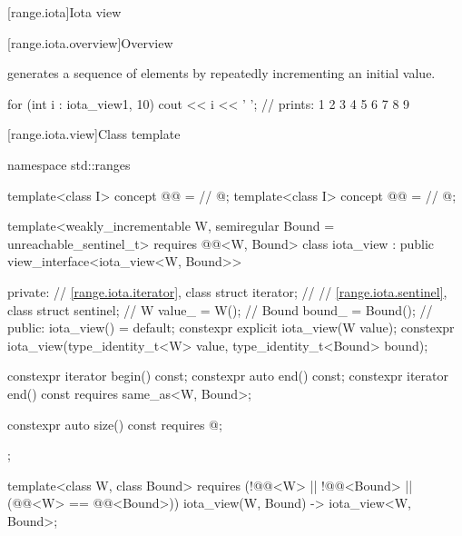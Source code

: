 [range.iota]{Iota view}

[range.iota.overview]{Overview}

\pnum
{} generates a
sequence of elements by repeatedly incrementing an initial value.

\pnum
\begin{example}
\begin{codeblock}
for (int i : iota_view{1, 10})
  cout << i << ' '; // prints: 1 2 3 4 5 6 7 8 9
\end{codeblock}
\end{example}

[range.iota.view]{Class template }

\begin{codeblock}
namespace std::ranges {
  template<class I>
    concept @@ =     // \expos
      @\seebelow@;
  template<class I>
    concept @@ =       // \expos
      @\seebelow@;

  template<weakly_incrementable W, semiregular Bound = unreachable_sentinel_t>
    requires @@<W, Bound>
  class iota_view : public view_interface<iota_view<W, Bound>> {
  private:
    // \ref{range.iota.iterator}, class 
    struct iterator;            // \expos
    // \ref{range.iota.sentinel}, class 
    struct sentinel;            // \expos
    W value_ = W();             // \expos
    Bound bound_ = Bound();     // \expos
  public:
    iota_view() = default;
    constexpr explicit iota_view(W value);
    constexpr iota_view(type_identity_t<W> value,
                        type_identity_t<Bound> bound);

    constexpr iterator begin() const;
    constexpr auto end() const;
    constexpr iterator end() const requires same_as<W, Bound>;

    constexpr auto size() const requires @\seebelow@;
  };

  template<class W, class Bound>
    requires (!@@<W> || !@@<Bound> ||
      (@@<W> == @@<Bound>))
    iota_view(W, Bound) -> iota_view<W, Bound>;
}
\end{codeblock}

